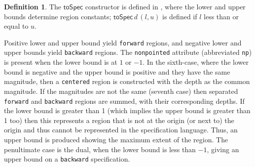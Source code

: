 \documentclass[10pt,preprint]{sigplanconf}
\newcounter{block}
\theoremstyle{definition}
\newtheorem{definition}[block]{Definition}
\newcommand{\term}[1]{\texttt{#1}}
\begin{document}
\begin{definition} The $\mathsf{toSpec}$ constructor is defined
in , where the lower and upper bounds
determine region constants; $\mathsf{toSpec} \, d \, (l, u)$ is defined
 if $l$ less than or equal to $u$.

Positive lower and upper bound yield \term{forward} regions, and
negative lower and upper bounds yield \term{backward} regions.
The \texttt{nonpointed} attribute (abbreviated \term{np})
is present when the lower bound is at $1$ or $-1$. 
In the sixth-case, where the lower bound
is negative and the upper bound is positive and they have the same
magnitude, then a \texttt{centered} region is constructed with
the depth as the common magnitude. If the magnitudes are not the same
(seventh case) then separated \texttt{forward} and \texttt{backward}
regions are summed, with their corresponding depths.
If the lower bound is greater than 1
(which implies the upper bound is greater than 1 too) then
this represents a region that is not at the origin (or next to) the
origin and thus cannot be represented in the specification language.
Thus, an upper bound is produced showing the maximum extent
of the region. The penultimate case is the dual, when the lower bound is less
than $-1$, giving an upper bound on a \texttt{backward} specification.
\end{definition}
\end{document}
